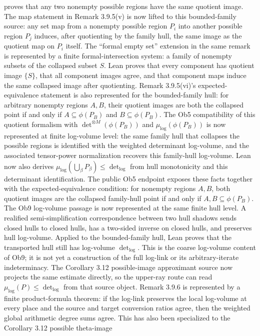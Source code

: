 \documentclass[11pt]{article}
\newcommand{\Lean}{Lean}
\theoremstyle{plain}
\theoremstyle{definition}
\theoremstyle{remark}
\begin{document}
proves that any two nonempty possible regions have the same quotient image.
The map statement in Remark 3.9.5(v) is now lifted to this bounded-family
source: any set map from a nonempty possible region \(P_i\) into another
possible region \(P_j\) induces, after quotienting by the family hull, the same
image as the quotient map on \(P_i\) itself.
The ``formal empty set'' extension in the same remark is represented by a
finite formal-intersection system: a family of nonempty subsets of the
collapsed subset \(S\).  \Lean{} proves that every component has quotient image
\(\{S\}\), that all component images agree, and that component maps induce the
same collapsed image after quotienting.
Remark 3.9.5(vi)'s expected-equivalence statement is also represented for the
bounded-family hull: for arbitrary nonempty regions \(A,B\), their quotient
images are both the collapsed point if and only if \(A\subseteq\phi(P_B)\) and
\(B\subseteq\phi(P_B)\).
The Ob5 compatibility of this quotient formalism with
\(\det^{\otimes M}(\phi(P_B))\) and \(\mu_{\log}(\phi(P_B))\) is now represented
at finite log-volume level: the same family hull that collapses the possible
regions is identified with the weighted determinant log-volume, and the
associated tensor-power normalization recovers this family-hull log-volume.
\Lean{} now also derives
\(\mu_{\log}(\bigcup_\beta P_\beta)\le\det_{\log}\) from hull monotonicity and
this determinant identification.  The public Ob5 endpoint exposes these facts
together with the expected-equivalence condition: for nonempty regions \(A,B\),
both quotient images are the collapsed family-hull point if and only if
\(A,B\subseteq\phi(P_B)\).
The Ob9 log-volume passage is now represented at the same finite hull level.
A realified semi-simplification correspondence between two hull shadows sends
closed hulls to closed hulls, has a two-sided inverse on closed hulls, and
preserves hull log-volume.  Applied to the bounded-family hull, \Lean{} proves
that the transported hull still has log-volume \(\det_{\log}\).  This is the
coarse log-volume content of Ob9; it is not yet a construction of the full
log-link or its arbitrary-iterate indeterminacy.
The Corollary 3.12 possible-image approximant source now projects the same
estimate directly, so the upper-ray route can read
\(\mu_{\log}(P)\le\det_{\log}\) from that source object.
Remark 3.9.6 is represented by a finite product-formula theorem: if the
log-link preserves the local log-volume at every place and the source and
target conversion ratios agree, then the weighted global arithmetic degree
sums agree.
This has also been specialized to the Corollary 3.12 possible theta-image
\end{document}
